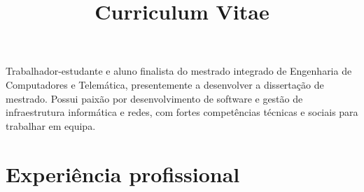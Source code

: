 \documentclass[11pt,a4paper,sans]{moderncv} %
\title{Curriculum Vitae}                               %
\begin{document}
\makecvtitle

\small{Trabalhador-estudante e aluno finalista do mestrado integrado de
  Engenharia de Computadores e Telemática, presentemente a desenvolver a
  dissertação de mestrado. Possui paixão por desenvolvimento de software e
  gestão de infraestrutura informática e redes, com fortes competências técnicas
  e sociais para trabalhar em equipa.}

\section{Experiência profissional}

\vspace{6pt}
\end{document}
